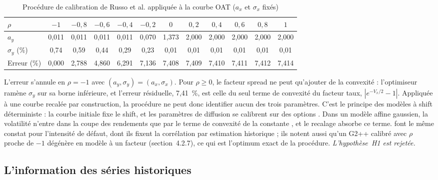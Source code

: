 \begin{table}[htbp]
\centering\small
\caption{Procédure de calibration de Russo et al. appliquée à la courbe OAT ($a_x$ et $\sigma_x$ fixés)}
\label{tab:h1}
\setlength{\tabcolsep}{4pt}
\begin{tabular}{@{}lccccccccccc@{}}
\toprule
$\rho$ & $-1$ & $-0{,}8$ & $-0{,}6$ & $-0{,}4$ & $-0{,}2$ & $0$ & $0{,}2$ & $0{,}4$ & $0{,}6$ & $0{,}8$ & $1$ \\
\midrule
$a_y$ & 0,011 & 0,011 & 0,011 & 0,011 & 0,070 & 1,373 & 2,000 & 2,000 & 2,000 & 2,000 & 2,000 \\
$\sigma_y$ (\%) & 0,74 & 0,59 & 0,44 & 0,29 & 0,23 & 0,01 & 0,01 & 0,01 & 0,01 & 0,01 & 0,01 \\
Erreur (\%) & 0,000 & 2,788 & 4,860 & 6,291 & 7,136 & 7,408 & 7,409 & 7,410 & 7,411 & 7,412 & 7,414 \\
\bottomrule
\end{tabular}
\end{table}

L'erreur s'annule en $\rho = -1$ avec $(a_y, \sigma_y) = (a_x, \sigma_x)$. Pour $\rho \ge 0$, le facteur spread ne
peut qu'ajouter de la convexité : l'optimiseur ramène $\sigma_y$ sur sa borne inférieure, et l'erreur
résiduelle, 7,41~\%, est celle du seul terme de convexité du facteur taux, $|e^{-V_x/2} - 1|$. Appliquée à une courbe recalée par construction, la
procédure ne peut donc identifier aucun des trois paramètres. C'est le principe des modèles à shift
déterministe : la courbe initiale fixe le shift, et les paramètres de diffusion se calibrent sur des options
\citep[CM2, p.~30-31]{Hillairet2026}. Dans un modèle affine gaussien, la volatilité n'entre dans la coupe des
rendements que par le terme de convexité de la constante \citep[cours~3, éq.~II.8]{MPR2025}, et le recalage
absorbe ce terme. \citet[section~22.7.2]{BrigoMercurio2006} font le même constat pour l'intensité de défaut,
dont ils fixent la corrélation par estimation historique ; ils notent aussi qu'un G2++ calibré avec $\rho$
proche de $-1$ dégénère en modèle à un facteur (section~4.2.7), ce qui est l'optimum exact de la procédure.
\emph{L'hypothèse~H1 est rejetée.}

\subsection{L'information des séries historiques}

